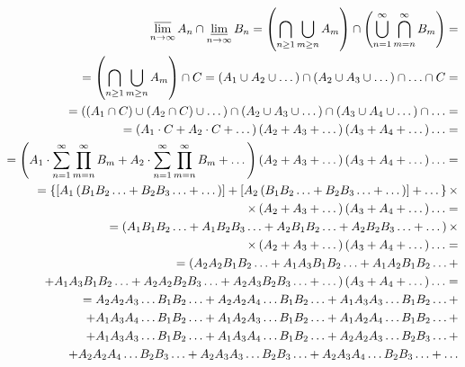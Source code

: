 \begin{enumerate}[label=\alph*)]
\begin{equation*}
\begin{split}
\varlimsup \limits_{ n \to \infty } A_n \cap \varliminf \limits_{ n \to \infty } B_n =
\left( \bigcap \limits_{ n \geq 1 } \bigcup \limits_{ m \geq n } A_m \right) \cap
\left( \bigcup \limits_{ n = 1 }^\infty \bigcap \limits_{ m = n }^\infty B_m \right) = \\
= \left( \bigcap \limits_{ n \geq 1 } \bigcup \limits_{ m \geq n } A_m \right) \cap C =
\left( A_1 \cup A_2 \cup \dotsc \right) \cap \left( A_2 \cup A_3 \cup \dotsc \right) \cap \dotsc \cap C = \\
= \left( \left( A_1 \cap C \right) \cup \left( A_2 \cap C \right) \cup \dotsc \right) \cap
\left( A_2 \cup A_3 \cup \dotsc \right) \cap \left( A_3 \cup A_4 \cup \dotsc \right) \cap \dotsc = \\
= \left( A_1 \cdot C + A_2 \cdot C + \dotsc \right) \left( A_2 + A_3 + \dotsc \right)
\left( A_3 + A_4 + \dotsc \right) \dotsc = \\
= \left( A_1 \cdot \sum \limits_{ n = 1 }^\infty \prod \limits_{ m = n }^\infty B_m +
A_2 \cdot \sum \limits_{ n = 1 }^\infty \prod \limits_{ m = n }^\infty B_m + \dotsc \right)
\left( A_2 + A_3 + \dotsc \right) \left( A_3 + A_4 + \dotsc \right) \dotsc =  \\
= \left\{ \left[ A_1 \left( B_1 B_2 \dotsc +B_2 B_3 \dotsc + \dotsc \right) \right] +
\left[ A_2 \left( B_1 B_2 \dotsc +B_2 B_3 \dotsc + \dotsc \right) \right] + \dotsc \right\} \times \\
\times \left( A_2 + A_3 + \dotsc \right) \left( A_3+A_4+ \dotsc \right) \dotsc = \\
= \left( A_1 B_1 B_2 \dotsc + A_1 B_2 B_3 \dotsc + A_2 B_1 B_2 \dotsc + A_2 B_2 B_3 \dotsc + \dotsc \right) \times \\
\times \left( A_2 + A_3 + \dotsc \right) \left( A_3 + A_4 + \dotsc \right) \dotsc = \\
= ( A_2 A_2 B_1 B_2 \dotsc + A_1 A_3 B_1 B_2 \dotsc + A_1 A_2 B_1 B_2 \dotsc + \\
+ A_1 A_3 B_1 B_2 \dotsc + A_2 A_2 B_2 B_3 \dotsc + A_2 A_3 B_2 B_3 \dotsc + \dotsc )
\left( A_3 + A_4+ \dotsc \right) \dotsc = \\
= A_2 A_2 A_3 \dotsc B_1 B_2 \dotsc + A_2 A_2 A_4 \dotsc B_1 B_2 \dotsc + A_1 A_3 A_3 \dotsc B_1 B_2 \dotsc + \\
+ A_1 A_3 A_4 \dotsc B_1 B_2 \dotsc + A_1 A_2 A_3 \dotsc B_1 B_2 \dotsc + A_1 A_2 A_4 \dotsc B_1 B_2 \dotsc + \\
+ A_1 A_3 A_3 \dotsc B_1 B_2 \dotsc + A_1 A_3 A_4 \dotsc B_1 B_2 \dotsc + A_2 A_2 A_3 \dotsc B_2 B_3 \dotsc + \\
+ A_2 A_2 A_4 \dotsc B_2 B_3 \dotsc + A_2 A_3 A_3 \dotsc B_2 B_3 \dotsc + A_2 A_3 A_4 \dotsc B_2 B_3 \dotsc + \dotsc 
\end{split}
\end{equation*}


\end{enumerate}
